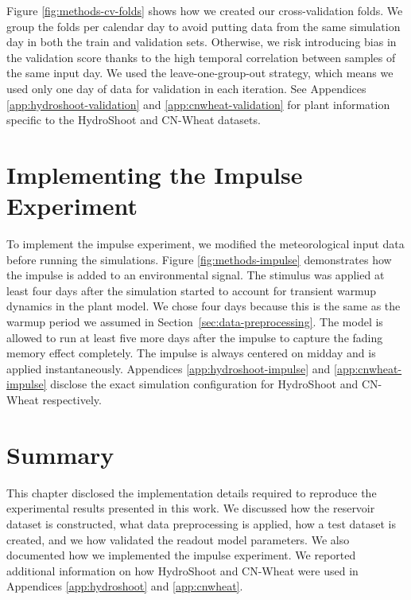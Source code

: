 Figure \ref{fig:methods-cv-folds} shows how we created our cross-validation folds. 
We group the folds per calendar day to avoid putting data from the same simulation day in both the train and validation sets.
Otherwise, we risk introducing bias in the validation score thanks to the high temporal correlation between samples of the same input day.
We used the leave-one-group-out strategy, which means we used only one day of data for validation in each iteration.
See Appendices \ref{app:hydroshoot-validation} and \ref{app:cnwheat-validation} for plant information specific to the HydroShoot and CN-Wheat datasets.




\section{Implementing the Impulse Experiment}

To implement the impulse experiment, we modified the meteorological input data before running the simulations.
Figure \ref{fig:methods-impulse} demonstrates how the impulse is added to an environmental signal.
The stimulus was applied at least four days after the simulation started to account for transient warmup dynamics in the plant model.
We chose four days because this is the same as the warmup period we assumed in \mbox{Section \ref{sec:data-preprocessing}}.
The model is allowed to run at least five more days after the impulse to capture the fading memory effect completely.
The impulse is always centered on midday and is applied instantaneously.
Appendices \ref{app:hydroshoot-impulse} and \ref{app:cnwheat-impulse} disclose the exact simulation configuration for HydroShoot and CN-Wheat respectively.



\section{Summary}

This chapter disclosed the implementation details required to reproduce the experimental results presented in this work.
We discussed how the reservoir dataset is constructed, what data preprocessing is applied, how a test dataset is created, and we how validated the readout model parameters. 
We also documented how we implemented the impulse experiment.
We reported additional information on how HydroShoot and CN-Wheat were used in Appendices \ref{app:hydroshoot} and \ref{app:cnwheat}.
